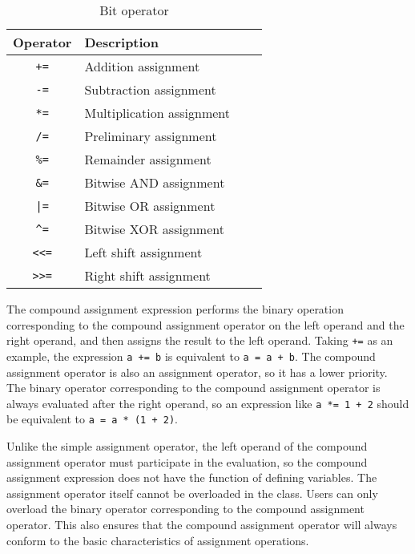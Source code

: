 \begin{table}[htb]
    \centering
    \setlength{\tabcolsep}{10mm}
    \begin{tabular}{clcl} \toprule
        \textbf{Operator} & \textbf{Description} \\ \midrule
        \texttt{+=} & Addition assignment \\
        \texttt{-=} & Subtraction assignment \\
        \texttt{*=} & Multiplication assignment \\
        \texttt{/=} & Preliminary assignment \\
        \texttt{\%=} & Remainder assignment \\
        \texttt{\&=} & Bitwise AND assignment \\
        \texttt{|=} & Bitwise OR assignment \\
        \texttt{\textasciicircum=} & Bitwise XOR assignment \\
        \texttt{<<=} & Left shift assignment \\
        \texttt{>>=} & Right shift assignment \\
        \bottomrule
    \end{tabular}
    \caption{Bit operator}
    \label{tab::compound_assign}
\end{table}

The compound assignment expression performs the binary operation corresponding to the compound assignment operator on the left operand and the right operand, and then assigns the result to the left operand. Taking \texttt{+=} as an example, the expression \texttt{a += b} is equivalent to \texttt{a = a + b}. The compound assignment operator is also an assignment operator, so it has a lower priority. The binary operator corresponding to the compound assignment operator is always evaluated after the right operand, so an expression like \texttt{a *= 1 + 2} should be equivalent to \texttt{a = a * (1 + 2)}.

Unlike the simple assignment operator, the left operand of the compound assignment operator must participate in the evaluation, so the compound assignment expression does not have the function of defining variables. The assignment operator itself cannot be overloaded in the class. Users can only overload the binary operator corresponding to the compound assignment operator. This also ensures that the compound assignment operator will always conform to the basic characteristics of assignment operations.

